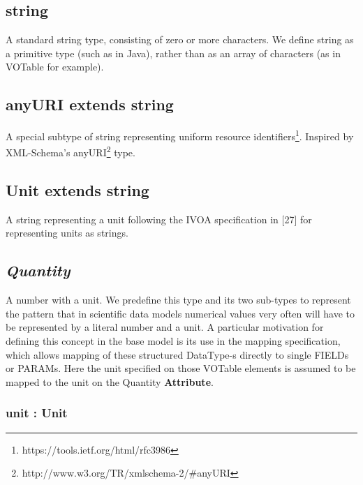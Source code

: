 \documentclass[10pt,a4paper]{ivoa}
\begin{document}
\hypertarget{string}{%
\subsection{string}\label{string}}

A standard string type, consisting of zero or more characters. We define
string as a primitive type (such as in Java), rather than as an array of
characters (as in VOTable for example).

\hypertarget{anyuri-extends-string}{%
\subsection{anyURI extends string}\label{anyuri-extends-string}}

A special subtype of string representing uniform resource
identifiers\footnote{https://tools.ietf.org/html/rfc3986}. Inspired by
XML-Schema's anyURI\footnote{http://www.w3.org/TR/xmlschema-2/\#anyURI}
type.

\hypertarget{unit-extends-string}{%
\subsection{Unit extends string}\label{unit-extends-string}}

A string representing a unit following the IVOA specification in
{[}27{]} for representing units as strings.

\hypertarget{quantity}{%
\subsection{\texorpdfstring{\emph{Quantity}}{Quantity}}\label{quantity}}

A number with a unit. We predefine this type and its two sub-types to
represent the pattern that in scientific data models numerical values
very often will have to be represented by a literal number and a unit. A
particular motivation for defining this concept in the base model is its
use in the mapping specification, which allows mapping of these
structured DataType-s directly to single FIELDs or PARAMs. Here the unit
specified on those VOTable elements is assumed to be mapped to the unit
on the Quantity \textbf{Attribute}.

\hypertarget{unit-unit}{%
\subsubsection{unit : Unit}\label{unit-unit}}
\end{document}
